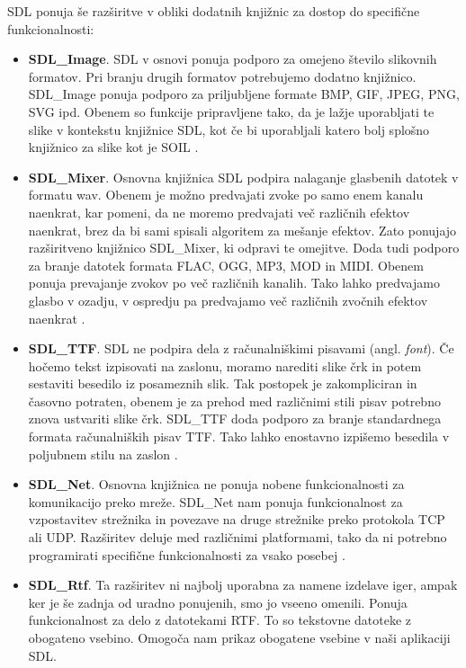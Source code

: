 \documentclass[12pt,a4paper,twoside]{book}
\begin{document}
SDL ponuja še razširitve v obliki dodatnih knjižnic za dostop do specifične funkcionalnosti:
\begin{itemize}
	\item \textbf{SDL\_Image}. SDL v osnovi ponuja podporo za omejeno število slikovnih formatov. Pri branju drugih formatov potrebujemo dodatno knjižnico. SDL\_Image ponuja podporo za priljubljene formate BMP, GIF, JPEG, PNG, SVG ipd. Obenem so funkcije pripravljene tako, da je lažje uporabljati te slike v kontekstu knjižnice SDL, kot če bi uporabljali katero bolj splošno knjižnico za slike kot je SOIL \cite{sdlimage}.
	\item \textbf{SDL\_Mixer}. Osnovna knjižnica SDL podpira nalaganje glasbenih datotek v formatu wav. Obenem je možno predvajati zvoke po samo enem kanalu naenkrat, kar pomeni, da ne moremo predvajati več različnih efektov naenkrat, brez da bi sami spisali algoritem za mešanje efektov. Zato ponujajo razširitveno knjižnico SDL\_Mixer, ki odpravi te omejitve. Doda tudi podporo za branje datotek formata FLAC, OGG, MP3, MOD in MIDI. Obenem ponuja prevajanje zvokov po več različnih kanalih. Tako lahko predvajamo glasbo v ozadju, v ospredju pa predvajamo več različnih zvočnih efektov naenkrat \cite{sdlmixer}.
	\item \textbf{SDL\_TTF}. SDL ne podpira dela z računalniškimi pisavami (angl. \textit{font}). Če hočemo tekst izpisovati na zaslonu, moramo narediti slike črk in potem sestaviti besedilo iz posameznih slik. Tak postopek je zakompliciran in časovno potraten, obenem je za prehod med različnimi stili pisav potrebno znova ustvariti slike črk. SDL\_TTF doda podporo za branje standardnega formata računalniških pisav TTF. Tako lahko enostavno izpišemo besedila v poljubnem stilu na zaslon \cite{sdlttf}.
	\item \textbf{SDL\_Net}. Osnovna knjižnica ne ponuja nobene funkcionalnosti za komunikacijo preko mreže. SDL\_Net nam ponuja funkcionalnost za vzpostavitev strežnika in povezave na druge strežnike preko protokola TCP ali UDP. Razširitev deluje med različnimi platformami, tako da ni potrebno programirati specifične funkcionalnosti za vsako posebej \cite{sdlnet}.
	\item \textbf{SDL\_Rtf}. Ta razširitev ni najbolj uporabna za namene izdelave iger, ampak ker je še zadnja od uradno ponujenih, smo jo vseeno omenili. Ponuja funkcionalnost za delo z datotekami RTF. To so tekstovne datoteke z obogateno vsebino. Omogoča nam prikaz obogatene vsebine v naši aplikaciji SDL.
\end{itemize}
\end{document}
